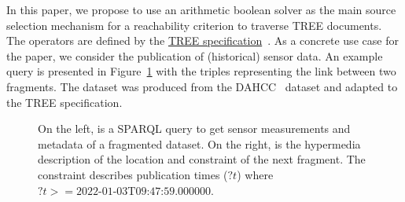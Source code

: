 In this paper, we propose to use an arithmetic boolean solver as the main source selection mechanism for a reachability criterion to traverse TREE documents.
The operators are defined by the \href{https://treecg.github.io/specification/}{TREE specification}~.
As a concrete use case for the paper, we consider the publication of (historical) sensor data.
An example query is presented in Figure~\ref{lst:system} with the triples representing the link between two fragments.
The dataset was produced from the DAHCC~\cite{dahcc_resource} dataset and adapted to the TREE specification.

\begin{figure}[h]
    \begin{minipage}{0.50\textwidth}
        \centering
        
    \end{minipage}
    \hspace{0.05\textwidth}
    \begin{minipage}{0.43\textwidth}
        \centering
        
    \end{minipage}
    \caption{On the left, is a SPARQL query to get sensor measurements and metadata of a fragmented dataset.
    On the right, is the hypermedia description of the location and constraint of the next fragment.
    The constraint describes publication times ($?t$) where $?t>= \text{2022-01-03T09:47:59.000000}$.}
        \label{lst:system}
\end{figure}